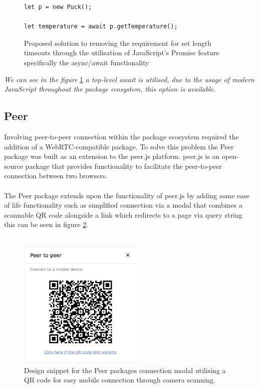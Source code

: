 \documentclass{l4proj}
\begin{document}
\begin{figure}[!ht]
    \centering
    \begin{lstlisting}
let p = new Puck();

let temperature = await p.getTemperature();
    \end{lstlisting}
    \caption{Proposed solution to removing the requirement for set length timeouts through the utilisation of JavaScript's Promise feature specifically the async/await functionality}
    \label{fig:async-await-core}
\end{figure}

\textit{We can see in the figure }\ref{fig:async-await-core} \textit{a top-level await is utilised, due to the usage of modern JavaScript throughout the package ecosystem, this option is available.}

\subsection{Peer}
\text Involving peer-to-peer connection within the package ecosystem required the addition of a WebRTC-compatible package. To solve this problem the Peer package was built as an extension to the peer.js platform. peer.js is an open-source package that provides functionality to facilitate the peer-to-peer connection between two browsers. 
\\ \\
The Peer package extends upon the functionality of peer.js by adding some ease of life functionality such as simplified connection via a modal that combines a scannable QR code alongside a link which redirects to a page via query string this can be seen in figure \ref{fig:qr-scan}. 
\\ \\
\begin{figure}[!ht]
    \centering
    \includegraphics[width=6cm]{dissertation/images/QR-p2p-modal.png}
    \caption{Design snippet for the Peer packages connection modal utilising a QR code for easy mobile connection through camera scanning.}
    \label{fig:qr-scan}
\end{figure}
\end{document}
